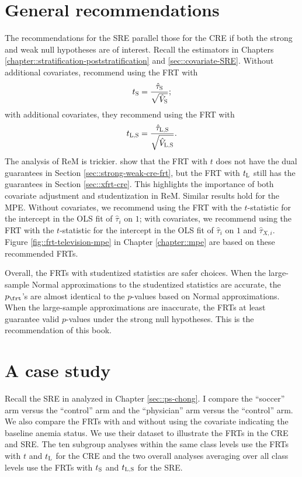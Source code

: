 \section{General recommendations}
The recommendations for the SRE parallel those for the CRE if both the strong and weak null hypotheses are of interest. 
Recall the estimators in Chapters \ref{chapter::stratification-poststratification} and \ref{sec::covariate-SRE}. 
Without additional covariates, \citet{zhao2020caFRT} recommend  using the FRT with 
$$
t_\textsc{S} =  \frac{  \hat{\tau}_\textsc{S} }{  \sqrt{\hat{V}_\textsc{S}} } ;
$$ 
with additional  covariates, they recommend using the FRT with 
$$
t_\textsc{L,S} =  \frac{  \hat{\tau}_\textsc{L,S} }{  \sqrt{\hat{V}_\textsc{L,S}} } . 
$$ 
The analysis of ReM is trickier. \citet{zhao2020caFRT} show that the FRT with $t$ does not have the dual guarantees in Section \ref{sec::strong-weak-cre-frt}, but the FRT with $t_\textsc{L}$ still has the guarantees in Section \ref{sec::xfrt-cre}. This highlights the importance of both covariate adjustment and studentization in ReM. 
Similar results hold for the MPE. Without covariates, we recommend using the FRT with the $t$-statistic for the intercept in the OLS fit of $\hat\tau_i$ on $1$; with covariates, we recommend using the FRT with the $t$-statistic for the intercept in the OLS fit of $\hat\tau_i$ on $1$ and $\hat\tau_{X,i}$. Figure \ref{fig::frt-television-mpe} in Chapter \ref{chapter::mpe} are based on these recommended FRTs. 

Overall, the FRTs with studentized statistics are safer choices. When the large-sample Normal approximations to the studentized statistics are accurate, the  $p_\frt$'s are almost identical to the $p$-values based on Normal approximations. When the large-sample approximations are inaccurate, the FRTs at least guarantee valid $p$-values under the strong null hypotheses. This is the recommendation of this book. 

\section{A case study}
\label{sec::case-study-chong}

 

Recall the SRE in \citet{chong2016iron} analyzed in Chapter \ref{sec::ps-chong}. 
I compare the ``soccer'' arm versus the ``control'' arm and the ``physician'' arm versus the ``control'' arm. We also compare the FRTs with and without using the covariate indicating the baseline anemia status. We use their dataset to illustrate the FRTs in the CRE and SRE.  The ten subgroup analyses within the same class levels use the FRTs with $t$ and $t_\textsc{L}$ for the CRE and the two overall analyses averaging over all class levels use the FRTs with $t_\textsc{S}$ and $t_\textsc{L,S}$ for the SRE. 

